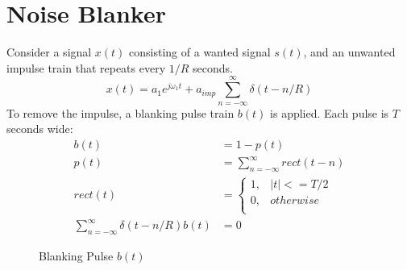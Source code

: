 \documentclass{article}
\begin{document}
\section{Noise Blanker}

Consider a signal $x(t)$ consisting of a wanted signal $s(t)$, and an unwanted impulse train that repeats every $1/R$ seconds.
\begin{equation}
x(t) = a_1 e^{j \omega_1 t} + a_{imp}\sum_{n=-\infty}^{\infty}\delta(t-n/R)
\end{equation}
To remove the impulse, a blanking pulse train $b(t)$ is applied.  Each pulse is $T$ seconds wide:
\begin{equation}
\begin{split}
b(t) &= 1 - p(t) \\
p(t) &= \sum_{n=-\infty}^{\infty}rect(t-n) \\
rect(t) &= 
	\begin{cases}
      1, & |t| <= T/2 \\
      0, & otherwise \\
	\end{cases} \\
\sum_{n=-\infty}^{\infty}\delta(t-n/R) b(t) &= 0
\end{split}
\end{equation} 

\begin{figure}[h]
\caption{Blanking Pulse $b(t)$ }
\vspace{5mm}
\label{fig:rect_time}
\centering
{}
\end{figure}
\end{document}
